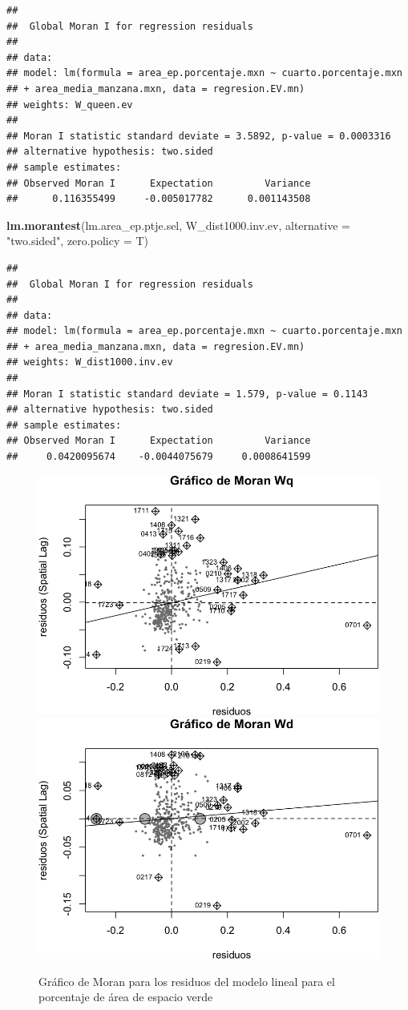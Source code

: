 \documentclass[12pt,]{book}
\newenvironment{Shaded}{\begin{snugshade}}{\end{snugshade}}
\newcommand{\KeywordTok}[1]{\textcolor[rgb]{0.13,0.29,0.53}{\textbf{#1}}}
\newcommand{\DataTypeTok}[1]{\textcolor[rgb]{0.13,0.29,0.53}{#1}}
\newcommand{\StringTok}[1]{\textcolor[rgb]{0.31,0.60,0.02}{#1}}
\newcommand{\NormalTok}[1]{#1}
\begin{document}
\begin{verbatim}
## 
##  Global Moran I for regression residuals
## 
## data:  
## model: lm(formula = area_ep.porcentaje.mxn ~ cuarto.porcentaje.mxn
## + area_media_manzana.mxn, data = regresion.EV.mn)
## weights: W_queen.ev
## 
## Moran I statistic standard deviate = 3.5892, p-value = 0.0003316
## alternative hypothesis: two.sided
## sample estimates:
## Observed Moran I      Expectation         Variance 
##      0.116355499     -0.005017782      0.001143508
\end{verbatim}

\begin{Shaded}
\begin{Highlighting}[]
\KeywordTok{lm.morantest}\NormalTok{(lm.area_ep.ptje.sel, W_dist1000.inv.ev, }\DataTypeTok{alternative =} \StringTok{"two.sided"}\NormalTok{, }
    \DataTypeTok{zero.policy =}\NormalTok{ T)}
\end{Highlighting}
\end{Shaded}

\begin{verbatim}
## 
##  Global Moran I for regression residuals
## 
## data:  
## model: lm(formula = area_ep.porcentaje.mxn ~ cuarto.porcentaje.mxn
## + area_media_manzana.mxn, data = regresion.EV.mn)
## weights: W_dist1000.inv.ev
## 
## Moran I statistic standard deviate = 1.579, p-value = 0.1143
## alternative hypothesis: two.sided
## sample estimates:
## Observed Moran I      Expectation         Variance 
##     0.0420095674    -0.0044075679     0.0008641599
\end{verbatim}

\begin{figure}
\includegraphics[width=0.49\linewidth]{tesis-unigis_files/figure-latex/moranplot-resareaep-w-1} \includegraphics[width=0.49\linewidth]{tesis-unigis_files/figure-latex/moranplot-resareaep-w-2} \caption{Gráfico de Moran para los residuos del modelo lineal para el porcentaje de área de espacio verde}\label{fig:moranplot-resareaep-w}
\end{figure}
\end{document}
